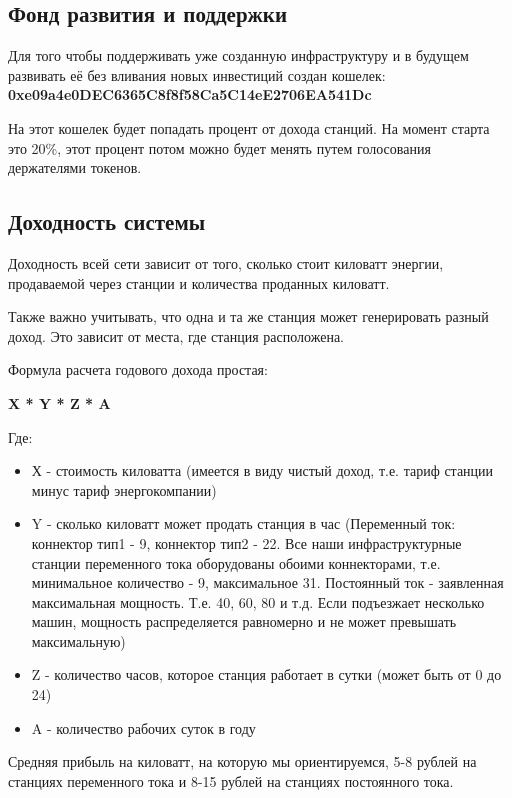 \documentclass[a4paper,12pt]{report}
\begin{document}
\subsection{Фонд развития и поддержки}
Для того чтобы поддерживать уже созданную инфраструктуру и в будущем развивать её без вливания новых инвестиций создан кошелек: 
\textbf{0xe09a4e0DEC6365C8f8f58Ca5C14eE2706EA541Dc}

На этот кошелек будет попадать процент от дохода станций. На момент старта это 20\%, этот процент потом можно будет менять путем голосования держателями токенов. 


\subsection{Доходность системы }
\label{capital}

Доходность всей сети зависит от того, сколько стоит киловатт энергии, продаваемой через станции и количества проданных киловатт. 

Также важно учитывать, что одна и та же станция может генерировать разный доход. Это зависит от места, где станция расположена.

Формула расчета годового дохода простая:


\textbf{X * Y * Z * A} 

Где:

\begin{itemize}
  \item Х - стоимость киловатта (имеется в виду чистый доход, т.е. тариф станции минус тариф энергокомпании)
  \item Y - сколько киловатт может продать станция в час (Переменный ток: коннектор тип1 - 9, коннектор тип2 - 22. Все наши инфраструктурные станции переменного тока оборудованы обоими коннекторами, т.е. минимальное  количество - 9, максимальное 31. Постоянный ток - заявленная максимальная мощность. Т.е. 40, 60, 80 и т.д. Если подъезжает несколько машин, мощность распределяется равномерно и не может превышать максимальную)

\item Z - количество часов, которое станция работает в сутки (может быть от 0 до 24)
\item A - количество рабочих суток в году

\end{itemize}

Средняя прибыль на киловатт, на которую мы ориентируемся,  5-8 рублей на станциях переменного тока и 8-15 рублей на станциях постоянного тока. 
\end{document}
